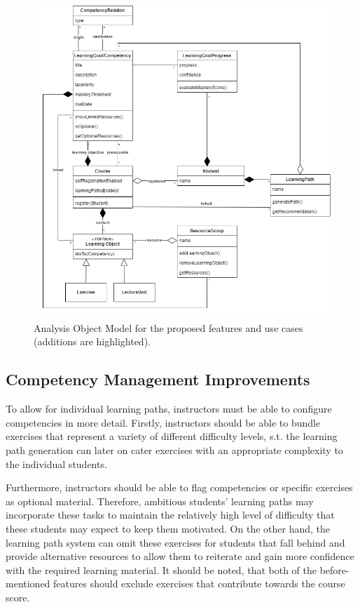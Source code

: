 \documentclass[a4paper,12pt,twoside]{article}
\begin{document}
\begin{figure}[h!]
        \centering
        \includegraphics[width=\linewidth]{figures/ObjectModel (3).drawio.png}
        \caption{Analysis Object Model for the proposed features and use cases (additions are highlighted).}
        \label{fig:AOM}
\end{figure}

\subsection{Competency Management Improvements}
To allow for individual learning paths, instructors must be able to configure competencies in more detail. Firstly, instructors should be
able to bundle exercises that represent a variety of different difficulty levels, s.t. the learning path generation can later on cater exercises
with an appropriate complexity to the individual students.

Furthermore, instructors should be able to flag competencies or specific exercises as optional material. Therefore, ambitious students' learning paths
may incorporate these tasks to maintain the relatively high level of difficulty that these students may expect to keep them motivated.
On the other hand, the learning path system can omit these exercises for students that fall behind and provide alternative resources to allow them
to reiterate and gain more confidence with the required learning material.
It should be noted, that both of the before-mentioned features should exclude exercises that contribute towards the course score.
\end{document}

